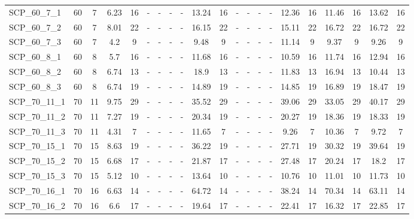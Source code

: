 \begin{sidewaystable}[!ht]
{\begin{tabular}{lcccccccccccccccccccc}
SCP\_60\_7\_1 & 60 & 7 &  \textcolor{blue2}{6.23} & 16 &  - &  - &  - &  - & 13.24 & 16 &  - &  - &  - &  - & 12.36 & 16 & 11.46 & 16 & 13.62 & 16 \\
SCP\_60\_7\_2 & 60 & 7 &  \textcolor{blue2}{8.01} & 22 &  - &  - &  - &  - & 16.15 & 22 &  - &  - &  - &  - & 15.11 & 22 & 16.72 & 22 & 16.72 & 22 \\
SCP\_60\_7\_3 & 60 & 7 &  \textcolor{blue2}{4.2} & 9 &  - &  - &  - &  - & 9.48 & 9 &  - &  - &  - &  - & 11.14 & 9 & 9.37 & 9 & 9.26 & 9 \\
SCP\_60\_8\_1 & 60 & 8 &  \textcolor{blue2}{5.7} & 16 &  - &  - &  - &  - & 11.68 & 16 &  - &  - &  - &  - & 10.59 & 16 & 11.74 & 16 & 12.94 & 16 \\
SCP\_60\_8\_2 & 60 & 8 &  \textcolor{blue2}{6.74} & 13 &  - &  - &  - &  - & 18.9 & 13 &  - &  - &  - &  - & 11.83 & 13 & 16.94 & 13 & 10.44 & 13 \\
SCP\_60\_8\_3 & 60 & 8 &  \textcolor{blue2}{6.74} & 19 &  - &  - &  - &  - & 14.89 & 19 &  - &  - &  - &  - & 14.85 & 19 & 16.89 & 19 & 18.47 & 19 \\
SCP\_70\_11\_1 & 70 & 11 &  \textcolor{blue2}{9.75} & 29 &  - &  - &  - &  - & 35.52 & 29 &  - &  - &  - &  - & 39.06 & 29 & 33.05 & 29 & 40.17 & 29 \\
SCP\_70\_11\_2 & 70 & 11 &  \textcolor{blue2}{7.27} & 19 &  - &  - &  - &  - & 20.34 & 19 &  - &  - &  - &  - & 20.27 & 19 & 18.36 & 19 & 18.33 & 19 \\
SCP\_70\_11\_3 & 70 & 11 &  \textcolor{blue2}{4.31} & 7 &  - &  - &  - &  - & 11.65 & 7 &  - &  - &  - &  - & 9.26 & 7 & 10.36 & 7 & 9.72 & 7 \\
SCP\_70\_15\_1 & 70 & 15 &  \textcolor{blue2}{8.63} & 19 &  - &  - &  - &  - & 36.22 & 19 &  - &  - &  - &  - & 27.71 & 19 & 30.32 & 19 & 39.64 & 19 \\
SCP\_70\_15\_2 & 70 & 15 &  \textcolor{blue2}{6.68} & 17 &  - &  - &  - &  - & 21.87 & 17 &  - &  - &  - &  - & 27.48 & 17 & 20.24 & 17 & 18.2 & 17 \\
SCP\_70\_15\_3 & 70 & 15 &  \textcolor{blue2}{5.12} & 10 &  - &  - &  - &  - & 13.64 & 10 &  - &  - &  - &  - & 10.76 & 10 & 11.01 & 10 & 11.73 & 10 \\
SCP\_70\_16\_1 & 70 & 16 &  \textcolor{blue2}{6.63} & 14 &  - &  - &  - &  - & 64.72 & 14 &  - &  - &  - &  - & 38.24 & 14 & 70.34 & 14 & 63.11 & 14 \\
SCP\_70\_16\_2 & 70 & 16 &  \textcolor{blue2}{6.6} & 17 &  - &  - &  - &  - & 19.64 & 17 &  - &  - &  - &  - & 22.41 & 17 & 16.32 & 17 & 22.85 & 17 \\

\end{tabular}}
\end{sidewaystable}
